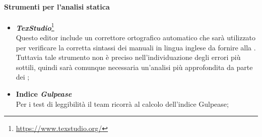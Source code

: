 	\paragraph{Strumenti per l'analisi statica}
	\begin{itemize}
		\item \emph{\textbf{\emph{TexStudio}}}\footnote{\href{https://www.texstudio.org/}{https://www.texstudio.org/}}
		~\\Questo editor include un correttore ortografico automatico che sarà utilizzato per verificare la corretta sintassi dei manuali in lingua inglese da fornire alla \proponente. Tuttavia tale strumento non è preciso nell'individuazione degli errori più sottili, quindi sarà comunque necessaria un'analisi più approfondita da parte dei \vers;
		\item \textbf{Indice \emph{Gulpease}}
		~\\Per i test di leggibilità il team ricorrà al calcolo dell'indice Gulpease;
		\begin{comment}
		\item 
		\emph{\textbf{\emph{JSHint}}}\ped{G}\footnote{\href{http://jshint.com/}{http://jshint.com/}}
		~\\È uno strumento \emph{OpenSource}\ped{G} funzionale alla rilevazione degli errori e possibili problemi nel codice \emph{JavaScript}\ped{G};
		\item 
		\emph{\textbf{\emph{W3C Markup Validation Service}}}\ped{G}\footnote{\href{https://validator.w3.org/}{https://validator.w3.org/}}
		~\\È uno strumento per la valid
		\item 
		\emph{\textbf{\emph{Draw.io}}}\ped{G}\footnote{\href{https://www.draw.io/}{https://www.draw.io/}}
		\\È un software per la creazione di diagrammi di flusso, di processo, organigrammi, UML, ER e diagrammi di rete.
		azione dei documenti \emph{HTML}\ped{G} e \emph{xHTML}\ped{G};
		\end{comment}
	\end{itemize}
\begin{comment}
	\paragraph{Strumenti per l'analisi dinamica}
	\begin{itemize}
		\item 
		\emph{\textbf{\emph{\textcolor{red}{Karma}}}}\ped{G}\footnote{\href{https://karma-runner.github.io/2.0/index.html}{https://karma-runner.github.io/2.0/index.html}}
		~\\È uno strumento per effettuare test di unità sugli script realizzati, installabile come modulo per \emph{Node.js}\ped{G};
		\item 
		\emph{\textbf{\emph{\textcolor{red}{Mocha}}}}\ped{G}\footnote{\href{https://mochajs.org/}{https://mochajs.org/}}
		~\\È un framework per l'esecuzione dei test asincroni e in serie di Javascript, scritto Node.js.
	\end{itemize}
\end{comment}
